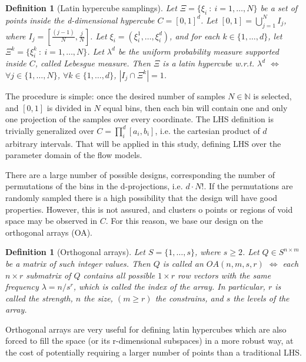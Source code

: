 \documentclass{article}
\newtheorem{definition}[theorem]{Definition}
\begin{document}
\begin{definition}[Latin hypercube samplings]
Let $\Xi=\{\xi_i\ :\ i=1,\dots,N\}$ be a set of points inside the d-dimensional hypercube $C=[0,1]^d$. Let $[0,1]=\bigcup_{j=1}^{N} I_j$, where $I_j=[\frac{(j-1)}{N},\frac{j}{N}]$. Let $\xi_i=\left(\xi_i^1,\dots,\xi_i^d\right)$, and for each $k\in\{1,\dots,d\}$, let $\Xi^k=\{\xi^k_i\ :\ i=1,\dots,N\}$. Let $\lambda^d$ be the uniform probability measure supported inside $C$, called Lebesgue measure. Then $\Xi$ is a latin hypercube w.r.t. $\lambda^d$ $\Longleftrightarrow$ $\forall j\in \{1,\dots,N\}$, $\forall k\in\{1,\dots,d\}$, $\left|I_j\cap\Xi^k\right|=1$.
\end{definition}

The procedure is simple: once the desired number of samples $N\in\mathbb N$ is selected, and $[0,1]$ is divided in $N$ equal bins, then each bin will contain one and only one projection of the samples over every coordinate. The LHS definition is trivially generalized over $C=\prod^d_i [a_i, b_i]$, i.e. the cartesian product of $d$ arbitrary intervals. That will be applied in this study, defining LHS over the parameter domain of the flow models.

There are a large number of possible designs, corresponding the number of permutations of the bins in the d-projections, i.e. $d\cdot N!$. If the permutations are randomly sampled there is a high possibility that the design will have good properties. However, this is not assured, and clusters o points or regions of void space may be observed in $C$. For this reason, we base our design on the orthogonal arrays (OA).

\begin{definition}[Orthogonal arrays]
Let $S=\{1,\dots,s\}$, where $s\ge 2$. Let $Q\in S^{n\times m}$ be a matrix of such integer values. Then $Q$ is called an $OA(n,m,s,r)$ $\Longleftrightarrow$ each $n\times r$ submatrix of $Q$ contains all possible $1\times r$ row vectors with the same frequency $\lambda=n/s^r$, which is called the index of the array. In particular, $r$ is called the strength, $n$ the size, $(m\ge r)$ the constrains, and $s$ the levels of the array.
\end{definition}

Orthogonal arrays are very useful for defining latin hypercubes which are also forced to fill the space (or its r-dimensional subspaces) in a more robust way, at the cost of potentially requiring a larger number of points than a traditional LHS.
\end{document}
